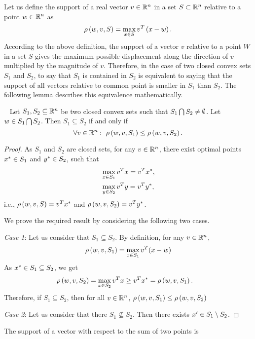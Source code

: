 Let us define the support of a real vector $v\in\mathbb{R}^n$ in a set
$S\subset\mathbb{R}^n$ relative to a point $w\in\mathbb{R}^n$ as
%
\[
\rho\left(w,v,S\right)=\max_{x\in S}v^T\left(x-w\right).
\]
%
According to the above definition, the support of a vector $v$
relative to a point $W$ in a set $S$ gives the maximum possible
displacement along the direction of $v$ multiplied by the magnitude of
$v$.  Therefore, in the case of two closed convex sets $S_1$ and
$S_2$, to say that $S_1$ is contained in $S_2$ is equivalent to saying
that the support of all vectors relative to common point is smaller in
$S_1$ than $S_2$.  The following lemma describes this equivalence
mathematically.
%
\begin{lemma}~\label{lem:support-inclusion}
Let $S_1,S_2\subseteq \mathbb{R}^n$ be two closed convex sets such that
$S_1\bigcap S_2\neq \emptyset$.  Let $w\in S_1\bigcap S_2$.
Then $S_1\subseteq S_2$ if and only if
%
\[
\forall
v\in\mathbb{R}^n:~\rho\left(w,v,S_1\right)\leq \rho\left(w,v,S_2\right).
\]
%
\end{lemma}
%
\begin{proof}
  As $S_1$ and $S_2$ are closed sets, for any $v\in\mathbb{R}^n$, there
  exist optimal points $x^*\in S_1$ and $y^*\in S_2$,
  such that
  \begin{align*}
&    \max_{x\in S_1} v^Tx=v^Tx^*,\\
& \max_{y\in S_2} v^T y=v^Ty^*,   
 \end{align*}
  i.e., $\rho\left(w,v,S\right)=v^Tx^*$ and $\rho\left(w,v,S_2\right)=v^Ty^*$.
  
  We prove the required result by considering the following two cases.
  
  {\it Case 1}: Let us consider that $S_1\subseteq  S_2$.  By definition, for any $v\in\mathbb{R}^n$, 
  \[
\rho\left(w,v,S_1\right)=\max_{x\in S_1}v^T(x-w)
  \]
 As $x^*\in S_1\subseteq S_2$, we get
  \begin{align*}
    & \rho\left(w,v,S_2\right)=\max_{x\in S_2}v^Tx\geq v^Tx^*= \rho\left(w,v,S_1\right). 
  \end{align*}
  Therefore, if $S_1\subseteq S_2$, then for all $v\in\mathbb{R}^n$, $\rho\left(w,v,S_1\right)\leq\rho\left(w,v,S_2\right)$
  
  {\it Case 2}: Let us consider that there $S_1\nsubseteq S_2$.  Then
  there exists $x^\prime\in S_1\setminus S_2$.   
  
\end{proof}
%
The support of a vector with respect to the sum of two points is
